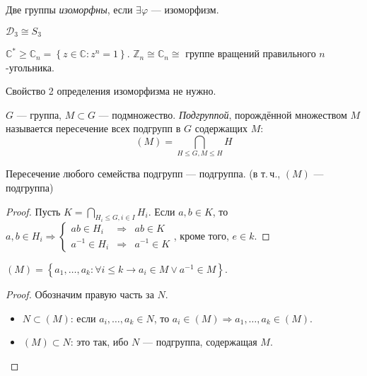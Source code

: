 \begin{define*}
  Две группы \emph{изоморфны}, если $\exists \varphi$ --- изоморфизм.
\end{define*}

\begin{example}
  $\mathcal{D}_3 \cong S_3$
\end{example}

\begin{example}
  $\mathbb{C}^* \geqslant \mathbb{C}_n = \left\{ z \in \mathbb{C}: z^n = 1 \right\}$. 
  $\mathbb{Z}_n \cong \mathbb{C}_n \cong$ группе вращений правильного $n$-угольника.
\end{example}

\begin{exercise}
  Свойство 2 определения изоморфизма не нужно.
\end{exercise}

\begin{define*}
  $G$ --- группа, $M \subset G$ --- подмножество. \emph{Подгруппой}, порождённой множеством $M$ называется пересечение всех подгрупп в $G$ содержащих $M$:
  $$(M) = \bigcap_{H\leqslant G, M\leqslant H}H$$
\end{define*}

\begin{claim}
  Пересечение любого семейства подгрупп --- подгруппа. (в т.\,ч., $(M)$ --- подгруппа)
\end{claim}

\begin{proof}
  Пусть $K = \bigcap_{H_i \leqslant G, i \in I}H_i$. Если $a, b \in K$, то 
  $a, b \in H_i \Rightarrow 
  \left\{ 
	\begin{aligned}
	  ab \in H_i &\Rightarrow& ab \in K\\ 
	  a^{-1} \in H_i &\Rightarrow& a^{-1} \in K
	\end{aligned}
  \right.$, кроме того, $e \in k$.
\end{proof}

\begin{claim}
  $(M) = \left\{ a_1, \ldots, a_k: \forall i \leqslant k \to a_i \in M \lor a^{-1} \in M \right\}$.
\end{claim}

\begin{proof}
  Обозначим правую часть за $N$.

  \begin{itemize}
	\item $N \subset (M)$: если $a_i, \ldots, a_k \in N$, то $a_i \in (M) \Rightarrow a_1, \ldots, a_k \in (M)$.
	\item $(M) \subset N$: это так, ибо $N$ --- подгруппа, содержащая $M$.
  \end{itemize}
\end{proof}



